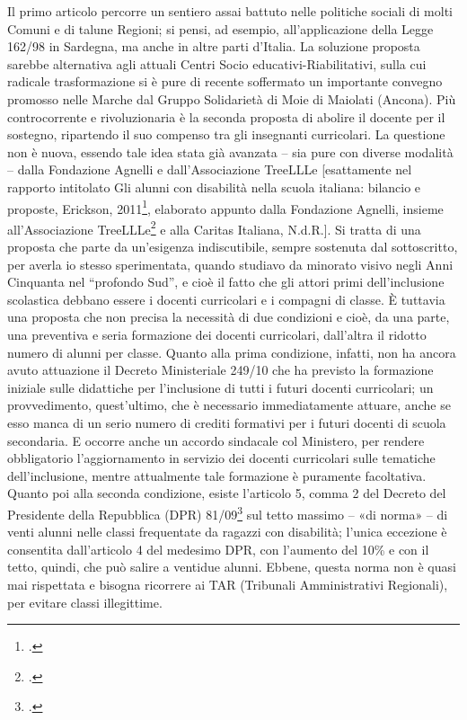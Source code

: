 Il primo articolo percorre un sentiero assai battuto nelle politiche sociali di molti Comuni e di talune Regioni; si pensi, ad esempio, all'applicazione della Legge 162/98 in Sardegna, ma anche in altre parti d'Italia. La soluzione proposta sarebbe alternativa agli attuali Centri Socio educativi-Riabilitativi, sulla cui radicale trasformazione si è pure di recente soffermato un importante convegno promosso nelle Marche dal Gruppo Solidarietà di Moie di Maiolati (Ancona).
Più controcorrente e rivoluzionaria è la seconda proposta di abolire il docente per il sostegno, ripartendo il suo compenso tra gli insegnanti curricolari. La questione non è nuova, essendo tale idea stata già avanzata – sia pure con diverse modalità – dalla Fondazione Agnelli e dall'Associazione TreeLLLe [esattamente nel rapporto intitolato Gli alunni con disabilità nella scuola italiana: bilancio e proposte, Erickson, 2011\footcite{treellle2011alunni}, elaborato appunto dalla Fondazione Agnelli, insieme all'Associazione TreeLLLe\footcite{treellle2011alunni} e alla Caritas Italiana, N.d.R.].
Si tratta di una proposta che parte da un'esigenza indiscutibile, sempre sostenuta dal sottoscritto, per averla io stesso sperimentata, quando studiavo da minorato visivo negli Anni Cinquanta nel “profondo Sud”, e cioè il fatto che gli attori primi dell'inclusione scolastica debbano essere i docenti curricolari e i compagni di classe. È tuttavia una proposta che non precisa la necessità di due condizioni e cioè, da una parte, una preventiva e seria formazione dei docenti curricolari, dall'altra il ridotto numero di alunni per classe.
Quanto alla prima condizione, infatti, non ha ancora avuto attuazione il Decreto Ministeriale 249/10 che ha previsto la formazione iniziale sulle didattiche per l'inclusione di tutti i futuri docenti curricolari; un provvedimento, quest'ultimo, che è necessario immediatamente attuare, anche se esso manca di un serio numero di crediti formativi per i futuri docenti di scuola secondaria. E occorre anche un accordo sindacale col Ministero, per rendere obbligatorio l'aggiornamento in servizio dei docenti curricolari sulle tematiche dell'inclusione, mentre attualmente tale formazione è puramente facoltativa.
Quanto poi alla seconda condizione, esiste l'articolo 5, comma 2 del Decreto del Presidente della Repubblica (DPR) 81/09\footcite{DPR_81_2009} sul tetto massimo – «di norma» – di venti alunni nelle classi frequentate da ragazzi con disabilità; l'unica eccezione è consentita dall'articolo 4 del medesimo DPR, con l'aumento del 10\% e con il tetto, quindi, che può salire a ventidue alunni. Ebbene, questa norma non è quasi mai rispettata e bisogna ricorrere ai TAR (Tribunali Amministrativi Regionali),  per evitare classi illegittime.

